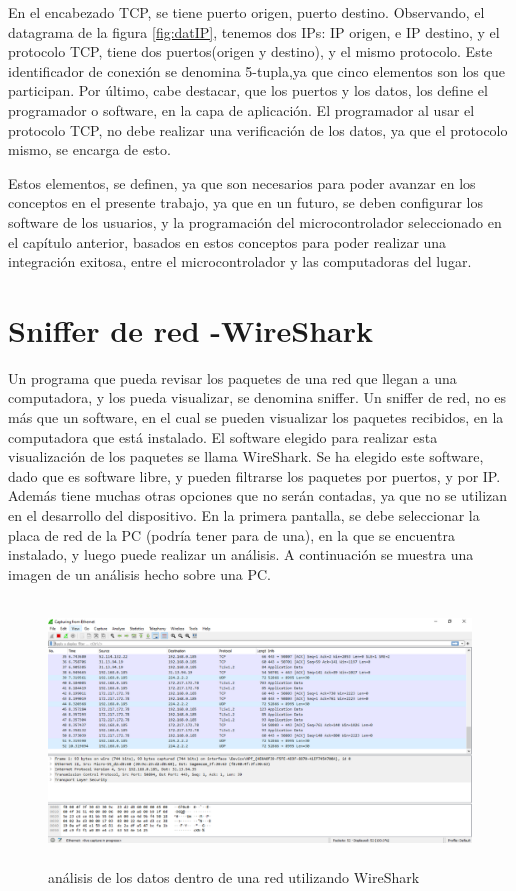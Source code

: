 	En el encabezado TCP, se tiene puerto origen, puerto destino. Observando, el datagrama de la figura \ref{fig:datIP}, tenemos dos IPs: IP origen, e IP destino, y el protocolo TCP, tiene dos puertos(origen y destino), y el mismo protocolo. Este identificador de conexión se denomina 5-tupla,ya que cinco elementos son los que participan. 
	Por último, cabe destacar, que los puertos y los datos, los define el programador o software, en la capa de aplicación. El programador al usar el protocolo TCP, no debe realizar una verificación de los datos, ya que el protocolo mismo, se encarga de esto. 
	
	Estos elementos, se definen, ya que son necesarios para poder avanzar en los conceptos en el presente trabajo, ya que en un futuro, se deben configurar los software de los usuarios, y la programación del microcontrolador seleccionado en el capítulo anterior, basados en estos conceptos para poder realizar una integración exitosa, entre el microcontrolador y las computadoras del lugar. 
	
\section{Sniffer de red -WireShark} 

Un programa que pueda revisar los paquetes de una red que llegan a una computadora, y los pueda visualizar, se denomina sniffer. Un sniffer de red, no es más que un software, en el cual se pueden visualizar los paquetes recibidos, en la computadora que está instalado. El software elegido para realizar esta visualización de los paquetes se llama WireShark. Se ha elegido este software, dado que es software libre, y pueden filtrarse los paquetes por puertos, y por IP. Además tiene muchas otras opciones que no serán contadas, ya que no se utilizan en el desarrollo del dispositivo. En la primera pantalla, se debe seleccionar la placa de red de la PC (podría tener para de una), en la que se encuentra instalado, y luego puede realizar un análisis. A continuación se muestra una imagen de un análisis hecho sobre una PC.
\begin{figure}[H]
	\centering 
	\includegraphics[height=7cm]{wireshark}
	\caption{análisis de los datos dentro de una red utilizando WireShark}
\end{figure}


